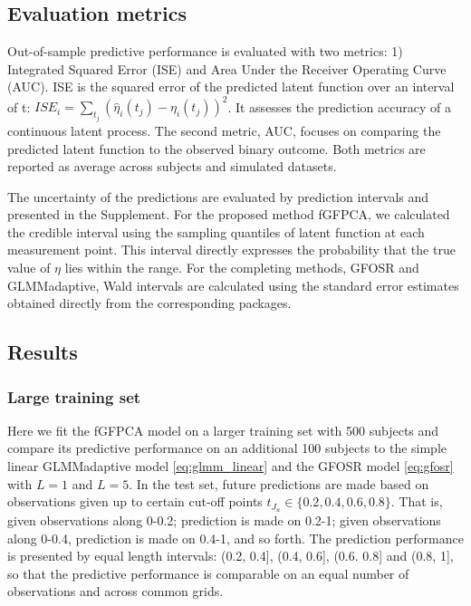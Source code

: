 \documentclass[12pt]{article}
\begin{document}
\subsection{Evaluation metrics}

Out-of-sample predictive performance is evaluated with two metrics: 1) Integrated Squared Error (ISE) and
Area Under the Receiver Operating Curve (AUC). ISE is the squared error of the predicted latent function over an interval of t: $ISE_i = \sum_{t_j}(\hat{\eta}_i(t_j)-\eta_i(t_j))^2$. It assesses the
prediction accuracy of a continuous latent process. 
The second metric, AUC, focuses on comparing the predicted latent function to the observed binary outcome. Both metrics are reported as average across subjects and simulated datasets. 

The uncertainty of the predictions are evaluated by prediction intervals and presented in the Supplement. For the proposed method fGFPCA, we calculated the credible interval using the sampling quantiles of latent function at each measurement point. This interval directly expresses the probability that the true value of $\eta$ lies within the range. For the completing methods, GFOSR and GLMMadaptive, Wald intervals are calculated using the standard error estimates obtained directly from the corresponding packages.

\subsection{Results}

\subsubsection{Large training set}
\label{sss:sim_result_large}

Here we fit the fGFPCA model on a larger training set with 500 subjects and compare its predictive performance on an additional 100 subjects to the simple linear GLMMadaptive model \ref{eq:glmm_linear} and the GFOSR model \ref{eq:gfosr} with $L=1$ and $L=5$. In the test set, future predictions are made based on observations given up to certain cut-off points $t_{J_u} \in \{0.2, 0.4, 0.6, 0.8\}$. That is, given observations along 0-0.2; prediction is made on 0.2-1; given observations along 0-0.4, prediction is made on 0.4-1, and so forth. The prediction performance is presented by equal length intervals: (0.2, 0.4], (0.4, 0.6], (0.6. 0.8] and (0.8, 1], so that the predictive performance is comparable on an equal number of observations and across common grids. 
\end{document}
